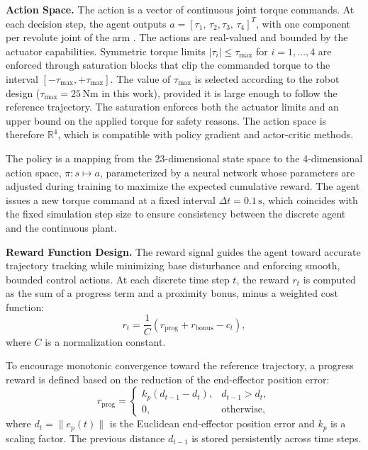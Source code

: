 \documentclass{ieeeaccess}
\begin{document}
\textbf{Action Space.} The action is a vector of continuous joint torque commands.
At each decision step, the agent outputs $a = [\tau_{1},\, \tau_{2}, \tau_{3},\, \tau_{4}]^T$, with
one component per revolute joint of the arm \cite{b2,b7}. The actions are real-valued and
bounded by the actuator capabilities. Symmetric torque limits $|\tau_{i}| \leq \tau_{\max}$ for $i = 1,\ldots,4$
are enforced through saturation blocks that clip the commanded torque to the interval $[-\tau_{\max}, +\tau_{\max}]$.
The value of $\tau_{\max}$ is selected according to the robot design ($\tau_{\max} = 25\,\mathrm{Nm}$
in this work), provided it is large enough to follow the reference trajectory. The
saturation enforces both the actuator limits and an upper bound on the applied torque
for safety reasons. The action space is therefore $\mathbb{R}^4$, which is compatible with policy
gradient and actor-critic methods.

The policy is a mapping from the 23-dimensional state space to
the 4-dimensional action space, $\pi: s \mapsto a$, parameterized by a neural network whose
parameters are adjusted during training to maximize the expected cumulative reward.
The agent issues a new torque command at a fixed interval $\Delta t = 0.1\,\mathrm{s}$,
which coincides with the fixed simulation step size to ensure consistency between the discrete
agent and the continuous plant.


\noindent
\textbf{Reward Function Design.} The reward signal guides the agent toward accurate trajectory tracking
while minimizing base disturbance and enforcing smooth, bounded control actions.
At each discrete time step $t$, the reward $r_t$ is computed as the sum
of a progress term and a proximity bonus, minus a weighted cost function:
\begin{equation}
r_t = \frac{1}{C}\left( r_{\text{prog}} + r_{\text{bonus}} - c_t \right),
\label{eq:reward}
\end{equation}
where $C$ is a normalization constant.

To encourage monotonic convergence toward the reference trajectory, a progress reward is defined based
on the reduction of the end-effector position error:
\begin{equation}
r_{\text{prog}} = 
\begin{cases}
k_p \left( d_{t-1} - d_t \right), & d_{t-1} > d_t,\\
0, & \text{otherwise},
\end{cases}
\end{equation}
where $d_t = \|e_p(t)\|$ is the Euclidean end-effector position error and $k_p$ is a
scaling factor. The previous distance $d_{t-1}$ is stored persistently across time steps.
\end{document}
